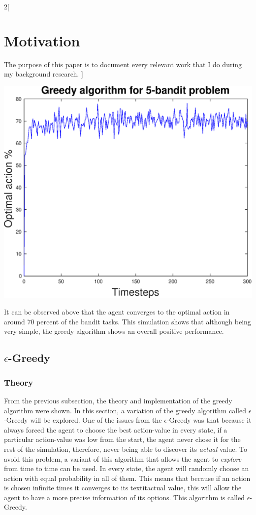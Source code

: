 \documentclass[a4paper]{article}
\newenvironment{Figure}
{\par\medskip\noindent\minipage{\linewidth}}
{\endminipage\par\medskip}
\begin{document}
\begin{multicols}{2}[
		\section*{Motivation}
		The purpose of this paper is to document every relevant work that I do during my background research.
		]
		\begin{Figure}
			\centering
			\includegraphics[width=\linewidth]{greedyplot2.eps}
		\end{Figure}
		
		It can be observed above that the agent converges to the optimal action in around 70 percent of the bandit tasks. This simulation shows that although being very simple, the greedy algorithm shows an overall positive performance.
		
		\subsection{$\epsilon$-Greedy}
		\subsubsection{Theory}
		From the previous subsection, the theory and implementation of the greedy algorithm were shown. In this section, a variation of the greedy algorithm called $\epsilon$-Greedy will be explored. One of the issues from the $\epsilon$-Greedy was that because it always forced the agent to choose the best action-value in every state, if a particular action-value was low from the start, the agent never chose it for the rest of the simulation, therefore, never being able to discover its \textit{actual} value. To avoid this problem, a variant of this algorithm that allows the agent to \textit{explore} from time to time can be used. In every state, the agent will randomly choose an action with equal probability in all of them. This means that because if an action is chosen infinite times it converges to its textit{actual} value, this will allow the agent to have a more precise information of its options. This algorithm is called $\epsilon$-Greedy.
		

\end{multicols}
\end{document}
